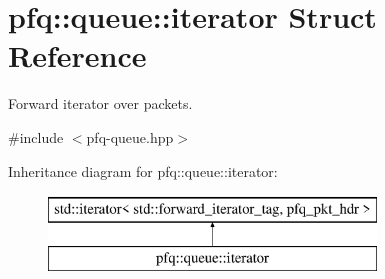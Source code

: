 \hypertarget{structpfq_1_1queue_1_1iterator}{\section{pfq\+:\+:queue\+:\+:iterator Struct Reference}
\label{structpfq_1_1queue_1_1iterator}
}


Forward iterator over packets.  




{\ttfamily \#include $<$pfq-\/queue.\+hpp$>$}

Inheritance diagram for pfq\+:\+:queue\+:\+:iterator\+:\begin{figure}[H]
\begin{center}
\leavevmode
\includegraphics[height=2.000000cm]{structpfq_1_1queue_1_1iterator}
\end{center}
\end{figure}
